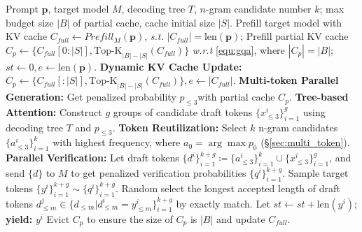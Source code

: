 \begin{algorithm}[t!]
\small
\caption{\ours}
\label{alg:algorithm}
\begin{algorithmic}[1]
\REQUIRE Prompt $\mathbf{p}$, target model $M$, decoding tree $T$, $n$-gram candidate number $k$; max budget size $|B|$ of partial cache, cache initial size $|S|$.
\STATE Prefill target model with KV cache $C_{full} \leftarrow Prefill_M(\mathbf{p})$, \textit{s.t.} $|C_{full}|=\text{len}(\mathbf{p})$;
\STATE Prefill partial KV cache $C_p \leftarrow \{C_{full}[0:|S|], \text{Top-K}_{|B|-|S|}(C_{full})\}$ \textit{w.r.t} \cref{equ:gqa}, where $|C_p|=|B|$;
\STATE $st \leftarrow 0, e \leftarrow \text{len}(\mathbf{p})$.
\STATE \textbf{Dynamic KV Cache Update: } $ C_p \leftarrow \{C_{full}[:|S|], \text{Top-K}_{|B|-|S|}(C_{full})\}, e \leftarrow |C_{full}|$.
\ENDIF
\STATE \textbf{Multi-token Parallel Generation:} Get penalized probability $p_{\leq 3}$\footnotemark with partial cache $C_p$.
\STATE \textbf{Tree-based Attention:} Construct $g$ groups of candidate draft tokens $\{x^i_{\leq 3}\}_{i=1}^{g}$ using decoding tree $T$ and $p_{\leq 3}$.
\STATE \textbf{Token Reutilization:} Select $k$ n-gram candidates $\{a^i_{\leq 3}\}_{i=1}^{k}$ with highest frequency, where $a_0=\arg\max p_0$ (\S \ref{sec:multi_token}).
\STATE \textbf{Parallel Verification:} Let draft tokens $\{d^i\}_{i=1}^{k+g} \coloneqq \{a^i_{\leq 3}\}_{i=1}^{k} \cup \{x^i_{\leq 3}\}_{i=1}^{g}$, and send $\{d\}$ to $M$ to get penalized verification probabilities $\{q^i\}_{i=1}^{k+g}$.
\STATE  Sample target tokens $\{y^i\}_{i=1}^{k+g} \sim \{q^i\}_{i=1}^{k+g}$.
\STATE Random select the longest accepted length of draft tokens $d^j_{\leq m} \in \{d_{\leq m}|d^i_{\leq m} = y^i_{\leq m}\}_{i=1}^{k+g}$ by exactly match.
\STATE Let $st \leftarrow st+\text{len}(y^i)$; \textbf{yield: } $y^i$
\STATE Evict $C_p$ to ensure the size of $C_p$ is $|B|$ and update $C_{full}$.
\ENDWHILE
\end{algorithmic}
\end{algorithm}
